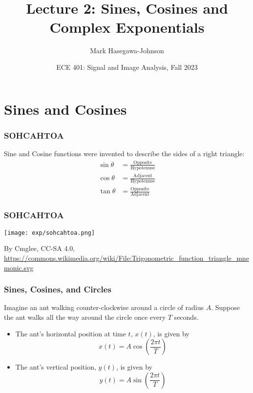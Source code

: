 \documentclass{beamer}
\title{Lecture 2: Sines, Cosines and Complex Exponentials}
\author{Mark Hasegawa-Johnson}
\date{ECE 401: Signal and Image Analysis, Fall 2023}
\begin{document}
\begin{frame}
  \maketitle
\end{frame}

\begin{frame}
  \tableofcontents
\end{frame}

\section[Cosines]{Sines and Cosines}
\setcounter{subsection}{1}

\begin{frame}
  \frametitle{SOHCAHTOA}

  Sine and Cosine functions were invented to describe the sides of a right triangle:
  \begin{align*}
    \sin\theta &= \frac{\mbox{Opposite}}{\mbox{Hypotenuse}}\\
    \cos\theta &= \frac{\mbox{Adjacent}}{\mbox{Hypotenuse}}\\
    \tan\theta &= \frac{\mbox{Opposite}}{\mbox{Adjacent}}
  \end{align*}
\end{frame}

\begin{frame}
  \frametitle{SOHCAHTOA}

  \centerline{\texttt{[image: exp/sohcahtoa.png]}}
  \begin{tiny}
    By Cmglee, CC-SA 4.0,
    \url{https://commons.wikimedia.org/wiki/File:Trigonometric_function_triangle_mnemonic.svg}
  \end{tiny}
\end{frame}

\begin{frame}
  \frametitle{Sines, Cosines, and Circles}

  Imagine an ant walking counter-clockwise around a circle of radius $A$.
  Suppose the ant walks all the way around the circle once every $T$ seconds.
  \begin{itemize}
  \item The ant's horizontal position at time $t$, $x(t)$, is given by
    \[
    x(t) = A\cos\left(\frac{2\pi t}{T}\right)
    \]
  \item The ant's vertical position, $y(t)$, is given by
    \[
    y(t) = A\sin\left(\frac{2\pi t}{T}\right)
    \]
  \end{itemize}
\end{frame}
\end{document}
